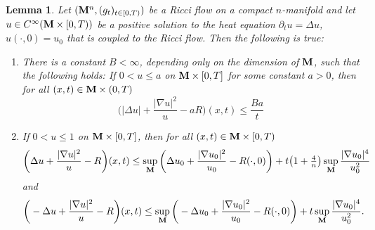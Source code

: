 \documentclass[11pt]{amsart}
\numberwithin{equation}{section}
\newtheorem{lemma}[theorem]{Lemma}
\def\be{\begin{equation}}
\def\ee{\end{equation}}
\def\lab{\label}
\def\M{{\bf M}}
\def\p{\partial}
\def\d{\nabla}
\numberwithin{equation}{section}
\begin{document}
\begin{lemma} \lab{leddu}
Let $(\M^n, (g_t)_{t \in [0,T)})$ be a Ricci flow on a compact $n$-manifold and let $u \in C^\infty (\M \times [0,T))$ be a positive solution to the heat equation $\p_t u = \Delta u$, $u(\cdot, 0) = u_0$ that is coupled to the Ricci flow.
Then the following is true:
\begin{enumerate}[label=(\alph*)]
\item There is a constant $B < \infty$, depending only on the dimension of $\M$, such that the following holds:
If $0<u \le a$ on $\M \times [0, T]$ for some constant $a > 0$, then for all $(x, t) \in \M \times (0,T)$
\be
\lab{ddu<A/t}
\bigg( |\Delta u | + \frac{| \d u |^2}{u} - a R \bigg) (x, t) \le \frac{ Ba}{t}
\ee
\item If $0<u \le 1$ on $\M \times [0, T]$, then for all $(x,t) \in \M \times [0,T)$
\[ \bigg( \Delta u + \frac{| \d u |^2}{u} - R \bigg) (x, t) \le \sup_{\M} \bigg( \Delta u_0 + \frac{| \d u_0 |^2}{u_0} - R(\cdot, 0) \bigg)
+t \big( 1+ \tfrac{4}{n} \big)  \sup_{\M} \frac{| \d u_0 |^4}{u^2_0} \]
and
\[ \bigg( -\Delta u + \frac{| \d u |^2}{u} - R \bigg) (x, t) \le
\sup_{\M} \bigg( -\Delta u_0 + \frac{| \d u_0 |^2}{u_0} - R(\cdot, 0) \bigg)
+ t \sup_{\M} \frac{| \d u_0 |^4}{u^2_0}. \]
\end{enumerate}
\end{lemma}
\end{document}
